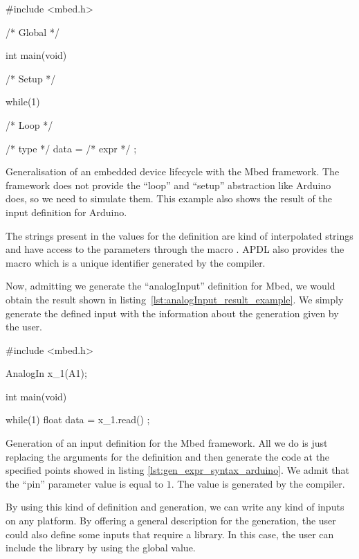 \begin{listing}[H]
  \centering
\begin{cppcode}
#include <mbed.h>

/* Global */

int main(void){
  /* Setup */

  while(1){
    /* Loop */
    
    /* type */ data = /* expr */ ;
  }
}
\end{cppcode}
  \caption[Generalisation of an embedded device lifecycle with
Mbed]{Generalisation of an embedded device lifecycle with the Mbed framework.
The framework does not provide the ``loop'' and ``setup'' abstraction like
Arduino does, so we need to simulate them. This example also shows the result of
the input definition for Arduino.}
  \label{lst:gen_expr_syntax_mbed}
\end{listing}

The strings present in the values for the  definition are kind
of interpolated strings and have access to the parameters through the macro
. \gls{APDL} also provides the macro
 which is a unique identifier generated by the compiler.

Now, admitting we generate the ``analogInput'' definition for Mbed, we would
obtain the result shown in listing~\ref{lst:analogInput_result_example}. We
simply generate the defined input with the information about the generation
given by the user.

\begin{listing}[H]
  \centering
\begin{cppcode}
#include <mbed.h>

AnalogIn x_1(A1);

int main(void){

  while(1){
    float data = x_1.read() ;
  }
}
\end{cppcode}
  \caption[Generation of an input definition for Mbed]{Generation of an input
definition for the Mbed framework. All we do is just replacing the arguments
for the definition and then generate the code at the specified points showed
in listing \ref{lst:gen_expr_syntax_arduino}. We admit that the ``pin''
parameter value is equal to $1$. The  value is generated by the
compiler.}
  \label{lst:analogInput_result_example}
\end{listing}

By using this kind of definition and generation, we can write any kind of inputs
on any platform. By offering a general description for the generation, the user
could also define some inputs that require a library. In this case, the user can include
the library by using the global value.

